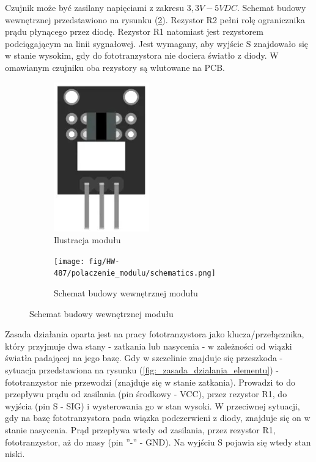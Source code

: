 \documentclass[11pt, a4paper]{article}
\begin{document}
Czujnik może być zasilany napięciami z zakresu $3,3V - 5V DC$. Schemat budowy wewnętrznej przedstawiono na rysunku (\ref{fig:_schemat_modulu}). Rezystor R2 pełni rolę ogranicznika prądu płynącego przez diodę. Rezystor R1 natomiast jest rezystorem podciągającym na linii sygnałowej. Jest wymagany, aby wyjście S znajdowało się w stanie wysokim, gdy do fototranzystora nie dociera światło z diody. W omawianym czujniku oba rezystory są wlutowane na PCB.

\begin{figure}[h]
\centering
\begin{subfigure}{.5\textwidth}
\centering
\includegraphics[width=.3\linewidth]{fig/HW-487/zdj_modułu/arduino_modules.png}
\caption{Ilustracja modułu \cite{ArduinoModules:PhotoInterrupter}}
\label{fig:_zdjecie_modulu}
\end{subfigure}%
\begin{subfigure}{.5\textwidth}
\centering
\texttt{[image: fig/HW-487/polaczenie\_modulu/schematics.png]}
\caption{Schemat budowy wewnętrznej modułu}
\label{fig:_schemat_modulu}
\end{subfigure}
\label{fig:modul}
\end{figure}
\vspace{0.25cm}
Zasada działania oparta jest na pracy fototranzystora jako klucza/przełącznika, który przyjmuje dwa stany - zatkania lub nasycenia - w zależności od wiązki światła padającej na jego bazę. Gdy w szczelinie znajduje się przeszkoda - sytuacja przedstawiona na rysunku (\ref{fig:_zasada_dzialania_elementu}) - fototranzystor nie przewodzi (znajduje się w stanie zatkania). Prowadzi to do przepływu prądu od zasilania (pin środkowy - VCC), przez rezystor R1, do wyjścia (pin S - SIG) i wysterowania go w stan wysoki. W przeciwnej sytuacji, gdy na bazę fototranzystora pada wiązka podczerwieni z diody, znajduje się on w stanie nasycenia. Prąd przepływa wtedy od zasilania, przez rezystor R1, fototranzystor, aż do masy (pin ''-'' - GND). Na wyjściu S pojawia się wtedy stan niski.
\end{document}

